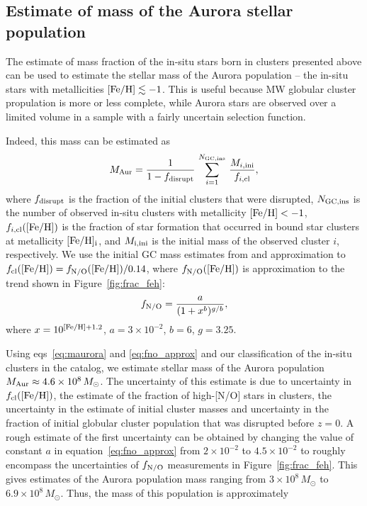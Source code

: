 \documentclass[a4paper,useAMS,usenatbib]{mnras}
\begin{document}
\subsection{Estimate of mass of the Aurora stellar population}
\label{sec:maurora}

The estimate of mass fraction of the in-situ stars born in clusters presented above can be used 
to estimate the stellar mass of the Aurora population -- the in-situ stars with metallicities $\rm [Fe/H]\lesssim -1$. This is useful because MW globular cluster propulation is more or less complete, while Aurora stars are observed over a limited volume in a sample
with a fairly uncertain selection function. 

Indeed, this mass can be estimated as
\begin{equation}
M_{\rm Aur}=\frac{1}{1-f_{\rm disrupt}}\,\sum_{i=1}^{N_{\rm GC,ins}}\, \frac{M_{i,\rm ini}}{f_{i,\rm cl}},
\label{eq:maurora}
\end{equation}
where $f_{\rm disrupt}$ is the fraction of the initial clusters that were disrupted, $N_{\rm GC,ins}$ is the number of observed in-situ clusters with metallicity $\rm [Fe/H]< -1$, $f_{i,\rm cl}({\rm [Fe/H]})$ is the fraction of star formation that occurred in bound star clusters at metallicity $\rm [Fe/H]_i$, and $M_{\rm i,ini}$ is the initial mass of the observed cluster $i$, respectively. We use the initial GC mass estimates from \citet{Baumgardt2003} and approximation to $f_{\rm cl}({\rm [Fe/H]})=f_{\rm N/O}({\rm [Fe/H]})/0.14$, where $f_{\rm N/O}({\rm [Fe/H]})$ is approximation to the trend shown in Figure~\ref{fig:frac_feh}:
\begin{equation}
f_{\rm N/O} = \frac{a}{(1+x^b)^{g/b}},    
\label{eq:fno_approx}
\end{equation}
where $x=10^{\rm [Fe/H]+1.2}$, $a=3\times 10^{-2}$, $b=6$, $g=3.25$.

Using eqs~\ref{eq:maurora} and \ref{eq:fno_approx} and our classification of the in-situ clusters in the 
\cite{Baumgardt_Vasiliev2021} catalog, we estimate stellar mass of the Aurora population $M_{\rm Aur}\approx 4.6\times 10^8\, M_\odot$. The uncertainty of this estimate is due to uncertainty 
in $f_{\rm cl}({\rm [Fe/H]})$, the estimate of the fraction of high-[N/O] stars in clusters, the uncertainty in the estimate of initial cluster masses and uncertainty in the fraction of initial globular cluster population that was disrupted before $z=0$. 
A rough estimate of the first uncertainty can be obtained by changing the value of constant $a$ in equation~\ref{eq:fno_approx} from $2\times 10^{-2}$ to $4.5\times 10^{-2}$ to roughly encompass the uncertainties of $f_{\rm N/O}$ measurements in Figure~\ref{fig:frac_feh}. This gives estimates of the Aurora population mass ranging from $3\times 10^8\, M_\odot$ to $6.9\times 10^8\, M_\odot$. Thus, the mass of this population is approximately
\end{document}
